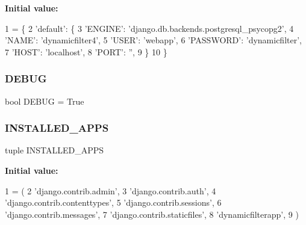 {\bfseries Initial value\+:}
\begin{DoxyCode}
1 =  \{
2     \textcolor{stringliteral}{'default'}: \{
3         \textcolor{stringliteral}{'ENGINE'}: \textcolor{stringliteral}{'django.db.backends.postgresql\_psycopg2'},
4         \textcolor{stringliteral}{'NAME'}: \textcolor{stringliteral}{'dynamicfilter4'},
5         \textcolor{stringliteral}{'USER'}: \textcolor{stringliteral}{'webapp'},
6         \textcolor{stringliteral}{'PASSWORD'}: \textcolor{stringliteral}{'dynamicfilter'},
7         \textcolor{stringliteral}{'HOST'}: \textcolor{stringliteral}{'localhost'},
8         \textcolor{stringliteral}{'PORT'}: \textcolor{stringliteral}{''},
9     \}
10 \}
\end{DoxyCode}
\mbox{\label{namespacedynamicfiltersite_1_1settings_a117352cc494cc62c6b2f1882786a332c}} 
\subsubsection{\texorpdfstring{D\+E\+B\+UG}{DEBUG}}
{\footnotesize\ttfamily bool D\+E\+B\+UG = True}

\mbox{\label{namespacedynamicfiltersite_1_1settings_a26c8442859071cd278fe3fe6485ea4f3}} 
\subsubsection{\texorpdfstring{I\+N\+S\+T\+A\+L\+L\+E\+D\+\_\+\+A\+P\+PS}{INSTALLED\_APPS}}
{\footnotesize\ttfamily tuple I\+N\+S\+T\+A\+L\+L\+E\+D\+\_\+\+A\+P\+PS}

{\bfseries Initial value\+:}
\begin{DoxyCode}
1 =  (
2     \textcolor{stringliteral}{'django.contrib.admin'},
3     \textcolor{stringliteral}{'django.contrib.auth'},
4     \textcolor{stringliteral}{'django.contrib.contenttypes'},
5     \textcolor{stringliteral}{'django.contrib.sessions'},
6     \textcolor{stringliteral}{'django.contrib.messages'},
7     \textcolor{stringliteral}{'django.contrib.staticfiles'},
8     \textcolor{stringliteral}{'dynamicfilterapp'},
9 )
\end{DoxyCode}
\mbox{\label{namespacedynamicfiltersite_1_1settings_a85bdb273c38bd7f0a06a3a38aa81225c}} 
